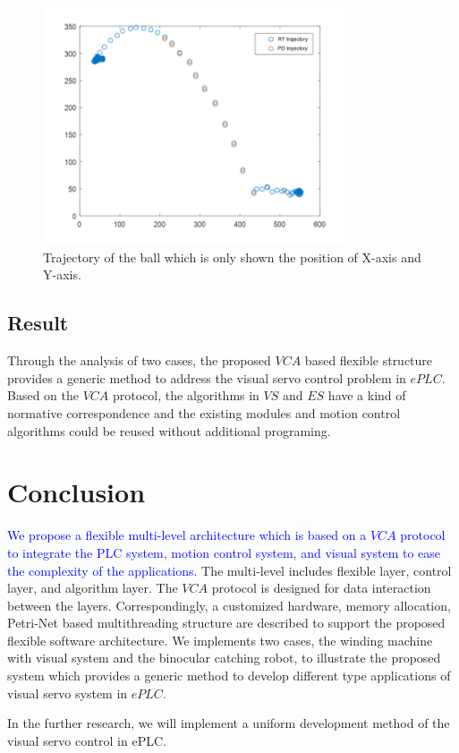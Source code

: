 \documentclass[journal,UTF8]{IEEEtran}
\begin{document}
\begin{figure}
	\centering
	\includegraphics[width=3.5in]{fig/PFofRobot.pdf}
	\caption{ Trajectory of the ball which is only shown the position of X-axis and Y-axis.}
	\label{fig:Trajectory}
\end{figure}

\subsection{Result}
Through the analysis of two cases, the proposed $VCA$ based flexible structure provides a generic method to address the visual servo control problem in $ePLC$. Based on the $VCA$ protocol, the algorithms in $VS$ and $ES$ have a kind of normative correspondence and the existing modules and motion control algorithms could be reused without additional programing. 
\section{Conclusion}
\label{conclusion}
\textcolor{blue}{We propose a flexible multi-level architecture which is based on a $VCA$ protocol to integrate the PLC system, motion control system, and visual system to ease the complexity of the applications.} The multi-level includes flexible layer, control layer, and algorithm layer. The $VCA$ protocol is designed for data interaction between the layers. Correspondingly, a customized hardware, memory allocation, Petri-Net based multithreading structure are described to support the proposed flexible software architecture. We implements two cases, the winding machine with visual system and the binocular catching robot, to illustrate the proposed system which provides a generic method to develop different type applications of visual servo system in $ePLC$.

In the further research, we will implement a uniform development method of the visual servo control in ePLC.
\end{document}
